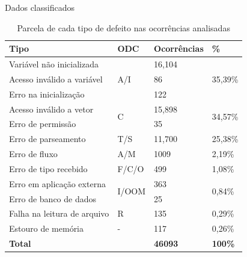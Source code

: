 \documentclass[brazilian]{beamer}
\begin{document}
\begin{frame}{Dados classificados}
    \begin{table}[H]
        \centering
        \begin{tabularx}{\linewidth}{ l|l|l|l }
            \textbf{Tipo} & \textbf{ODC} & \textbf{Ocorrências} & \textbf{\%} \\
            \hline
            Variável não inicializada & \multirow{3}{*}{ A/I } & 16,104 & \multirow{3}{*}{ 35,39\% } \\
            Acesso inválido a variável & & 86 & \\
            Erro na inicialização & & 122 & \\
            \hline
            Acesso inválido a vetor & \multirow{2}{*}{C} & 15,898 & \multirow{2}{*}{34,57\%} \\
            Erro de permissão & & 35 & \\
            \hline
            Erro de parseamento & T/S & 11,700 & 25,38\% \\
            \hline
            Erro de fluxo & A/M & 1009 & 2,19\% \\
            \hline
            Erro de tipo recebido & F/C/O & 499 & 1,08\% \\
            \hline
            Erro em aplicação externa & \multirow{2}{*}{I/OOM} & 363 & \multirow{2}{*}{0,84\%} \\
            Erro de banco de dados & & 25 \\
            \hline
            Falha na leitura de arquivo & R & 135 & 0,29\% \\
            \hline
            Estouro de memória & - & 117 & 0,26\% \\
            \hline
            \multicolumn{2}{l|}{\textbf{Total}} & \textbf{46093} & \textbf{100\%} \\
        \end{tabularx}
        \caption{Parcela de cada tipo de defeito nas ocorrências analisadas}
        \label{table:our_results_classified_by_odc_2}
    \end{table}
\end{frame}
\end{document}
